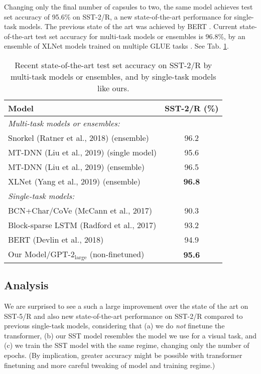 \documentclass[11pt,a4paper]{article}
\begin{document}
Changing only the final number of capsules to two, the same model achieves test set accuracy of 95.6\% on SST-2/R, a new state-of-the-art performance for single-task models. The previous state of the art was achieved by BERT \cite{DBLP:journals/corr/abs-1810-04805}. Current state-of-the-art test set accuracy for multi-task models or ensembles is 96.8\%, by an ensemble of XLNet models trained on multiple GLUE tasks \cite{DBLP:journals/corr/abs-1906-08237}. See Tab. \ref{tab:SST2R}.

\begin{table}[h]
	\small
	\begin{center}
		\begin{tabular}{@{}lc@{}}
			\toprule
			\bf Model & \bf SST-2/R (\%) \\
			\midrule
			\em Multi-task models or ensembles: &  \\
			Snorkel (Ratner et al., 2018) (ensemble) & 96.2 \\
			MT-DNN (Liu et al., 2019) (single model) & 95.6 \\
			MT-DNN (Liu et al., 2019) (ensemble) & 96.5 \\
			XLNet (Yang et al., 2019) (ensemble) & \bf 96.8 \\
			\midrule
			\em Single-task models: & \\
			BCN+Char/{\scriptsize CoVe} (McCann et al., 2017) & 90.3 \\		
			Block-sparse LSTM (Radford et al., 2017) & 93.2 \\
			BERT (Devlin et al., 2018) & 94.9 \\
			Our Model/{\scriptsize GPT-2$_\text{large}$ (non-finetuned)} & \bf 95.6 \\
			\bottomrule
		\end{tabular}
	\end{center}
	\caption{\label{tab:SST2R}Recent state-of-the-art test set accuracy on SST-2/R by multi-task models or ensembles, and by single-task models like ours.}
\end{table}

\subsection{Analysis}

We are surprised to see a such a large improvement over the state of the art on SST-5/R and also new state-of-the-art performance on SST-2/R compared to previous single-task models, considering that (a) we do {\em not} finetune the transformer, (b) our SST model resembles the model we use for a visual task, and (c) we train the SST model with the same regime, changing only the number of epochs. (By implication, greater accuracy might be possible with transformer finetuning and more careful tweaking of model and training regime.)
\end{document}
